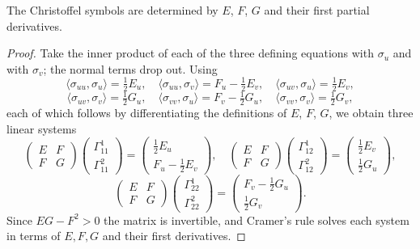 \documentclass[a4paper]{scrartcl}
\begin{document}
\begin{lemma}
    The Christoffel symbols are determined by $E$, $F$, $G$ and their first partial derivatives.
\end{lemma}
\begin{proof}
    Take the inner product of each of the three defining equations with $\sigma_u$ and with $\sigma_v$; the normal terms drop out. Using
    $$
    \langle \sigma_{uu}, \sigma_u\rangle = \tfrac12 E_u, \quad \langle\sigma_{uu},\sigma_v\rangle = F_u - \tfrac12 E_v, \quad \langle\sigma_{uv},\sigma_u\rangle = \tfrac12 E_v, $$
    $$\langle \sigma_{uv},\sigma_v\rangle = \tfrac12 G_u, \quad \langle\sigma_{vv},\sigma_u\rangle = F_v - \tfrac12 G_u, \quad \langle\sigma_{vv},\sigma_v\rangle = \tfrac12 G_v,
    $$
    each of which follows by differentiating the definitions of $E$, $F$, $G$, we obtain three linear systems
    $$
    \begin{pmatrix} E & F \\ F & G\end{pmatrix}\begin{pmatrix}\Gamma^1_{11} \\ \Gamma^2_{11}\end{pmatrix} = \begin{pmatrix} \tfrac12 E_u \\ F_u - \tfrac12 E_v\end{pmatrix}, \quad
    \begin{pmatrix} E & F \\ F & G\end{pmatrix}\begin{pmatrix}\Gamma^1_{12} \\ \Gamma^2_{12}\end{pmatrix} = \begin{pmatrix} \tfrac12 E_v \\ \tfrac12 G_u\end{pmatrix},
    $$
    $$
    \begin{pmatrix} E & F \\ F & G\end{pmatrix}\begin{pmatrix}\Gamma^1_{22} \\ \Gamma^2_{22}\end{pmatrix} = \begin{pmatrix} F_v - \tfrac12 G_u \\ \tfrac12 G_v\end{pmatrix}.
    $$
    Since $EG - F^2 > 0$ the matrix is invertible, and Cramer's rule solves each system in terms of $E, F, G$ and their first derivatives.
\end{proof}
\end{document}
